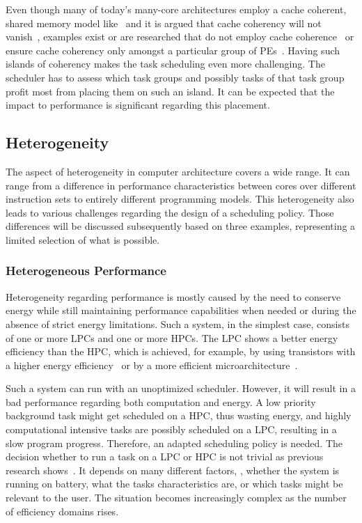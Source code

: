 Even though many of today's many-core architectures employ a cache coherent, shared memory model like~\cite{Intel-2012-XeonPhiManual,Doud-2015-TILE-Mx,Balkind-2016-OpenPiton} and it is argued that cache coherency will not vanish~\cite{Martin-2012-CacheCoherence}, examples exist or are researched that do not employ cache coherence~\cite{Intel-2010-SCC} or ensure cache coherency only amongst a particular group of \acp{PE}~\cite{Fu-2015-CDR}. Having such islands of coherency makes the task scheduling even more challenging. The scheduler has to assess which task groups and possibly tasks of that task group profit most from placing them on such an island. It can be expected that the impact to performance is significant regarding this placement.


\subsection{Heterogeneity}

The aspect of heterogeneity in computer architecture covers a wide range. It can range from a difference in performance characteristics between cores over different instruction sets to entirely different programming models. This heterogeneity also leads to various challenges regarding the design of a scheduling policy. Those differences will be discussed subsequently based on three examples, representing a limited selection of what is possible.

\subsubsection{Heterogeneous Performance}

Heterogeneity regarding performance is mostly caused by the need to conserve energy while still maintaining performance capabilities when needed or during the absence of strict energy limitations. Such a system, in the simplest case, consists of one or more \acp{LPC} and one or more \acp{HPC}. The \ac{LPC} shows a better energy efficiency than the \ac{HPC}, which is achieved, for example, by using transistors with a higher energy efficiency~\cite{Nvidia-2011-Tegra} or by a more efficient microarchitecture~\cite{ARM-2013-bigLITTLEarch}.

Such a system can run with an unoptimized scheduler. However, it will result in a bad performance regarding both computation and energy. A low priority background task might get scheduled on a \ac{HPC}, thus wasting energy, and highly computational intensive tasks are possibly scheduled on a \ac{LPC}, resulting in a slow program progress. Therefore, an adapted scheduling policy is needed. The decision whether to run a task on a \ac{LPC} or \ac{HPC} is not trivial as previous research shows~\cite{Nabelsee-2016-Centralized,Saez-2015-ACFS}. It depends on many different factors, \eg, whether the system is running on battery, what the tasks characteristics are, or which tasks might be relevant to the user. The situation becomes increasingly complex as the number of efficiency domains rises.

